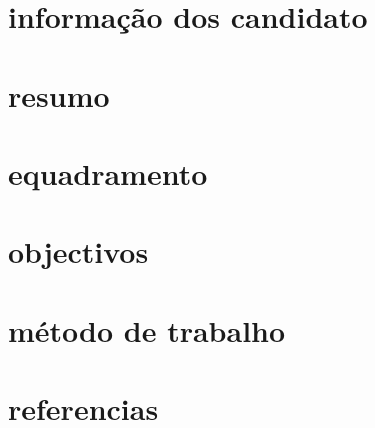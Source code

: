 
\maketitle
\section{informação dos candidato}
\section{resumo}
\section{equadramento}
\section{objectivos}
\section{método de trabalho}
\section{referencias}

